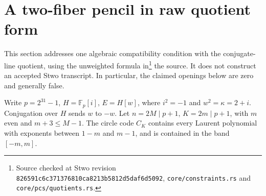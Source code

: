 \documentclass[11pt,letterpaper]{article}
\theoremstyle{definition}
\theoremstyle{remark}
\begin{document}
\section{A two-fiber pencil in raw quotient form}
\label{app:b2raw}
This section addresses one algebraic compatibility condition with the
conjugate-line quotient, using the unweighted formula in\footnote{Source checked at Stwo revision \nolinkurl{826591c6c371376810ca8213b5812d5daf6d5092}, \texttt{core/constraints.rs} and \texttt{core/pcs/quotients.rs}.} the source. It does not construct an accepted Stwo transcript.
In particular, the claimed openings below are zero and generally false.

Write $p=2^{31}-1$, $H=\mathbb F_p[i]$, $E=H[w]$, where
$i^2=-1$ and $w^2=\kappa=2+i$. Conjugation over $H$ sends $w$ to $-w$.
Let $n=2M\mid p+1$, $K=2m\mid p+1$, with $m$ even and $m+3\le M-1$.
The circle code $C_K$ contains every Laurent polynomial with exponents
between $1-m$ and $m-1$, and is contained in the band $[-m,m]$.
\end{document}
